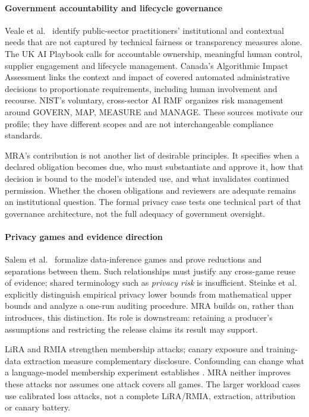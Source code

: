 \documentclass[conference,compsoc]{IEEEtran}
\begin{document}
\paragraph{Government accountability and lifecycle governance}
Veale et al.\ \citep{veale2018publicsector} identify public-sector
practitioners' institutional and contextual needs that are not captured by
technical fairness or transparency measures alone. The UK AI Playbook
\citep{ukAIPlaybook} calls for accountable ownership, meaningful human
control, supplier engagement and lifecycle management. Canada's Algorithmic
Impact Assessment \citep{canadaAIA} links the context and impact of covered
automated administrative decisions to proportionate requirements, including
human involvement and recourse. NIST's voluntary, cross-sector AI RMF
\citep{nist2023airmf} organizes risk management around GOVERN, MAP, MEASURE
and MANAGE. These sources motivate our profile; they have different scopes
and are not interchangeable compliance standards.

MRA's contribution is not another list of desirable principles. It specifies
when a declared obligation becomes due, who must substantiate and approve it,
how that decision is bound to the model's intended use, and what invalidates
continued permission. Whether the chosen obligations and reviewers are
adequate remains an institutional question. The formal privacy case tests
one technical part of that governance architecture, not the full adequacy
of government oversight.

\paragraph{Privacy games and evidence direction}
Salem et al.\ \citep{salem2023privacygames} formalize data-inference games and
prove reductions and separations between them. Such relationships must
justify any cross-game reuse of evidence; shared terminology such as
\emph{privacy risk} is insufficient. Steinke et al.\
\citep{steinke2023onerun} explicitly distinguish empirical privacy lower
bounds from mathematical upper bounds and analyze a one-run auditing
procedure. MRA builds on, rather than introduces, this distinction. Its
role is downstream: retaining a producer's assumptions and restricting the
release claims its result may support.

LiRA \citep{carlini2022lira} and RMIA \citep{zarifzadeh2024rmia} strengthen
membership attacks; canary exposure \citep{carlini2019secret} and
training-data extraction \citep{carlini2021extracting} measure complementary
disclosure. Confounding can change what a language-model membership
experiment establishes \citep{duan2024membership}. MRA neither improves
these attacks nor assumes one attack covers all games. The larger workload
cases use calibrated loss attacks, not a complete LiRA/RMIA, extraction,
attribution or canary battery.
\end{document}
